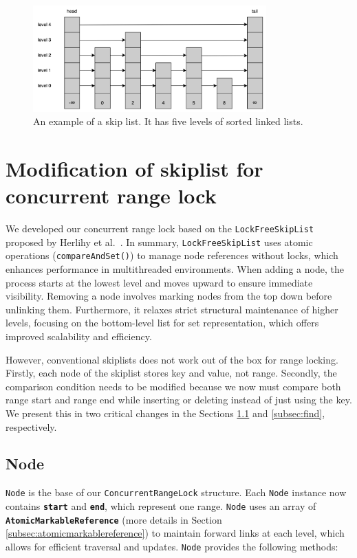 \begin{figure}[h!]
    \centering
    \includegraphics[width=0.8\textwidth]{./figures/skiplist.png}
    \caption{An example of a skip list. It has five levels of sorted linked lists.}
    \label{fig:skiplist}
\end{figure}

\section{Modification of skiplist for concurrent range lock}

We developed our concurrent range lock based on the \texttt{LockFreeSkipList} proposed by Herlihy et al.~\parencite{herlihy2020art}.
In summary, \texttt{LockFreeSkipList} uses atomic operations (\texttt{compareAndSet()}) to manage node references without locks, which enhances performance in multithreaded environments.
When adding a node, the process starts at the lowest level and moves upward to ensure immediate visibility.
Removing a node involves marking nodes from the top down before unlinking them.
Furthermore, it relaxes strict structural maintenance of higher levels, focusing on the bottom-level list for set representation, which offers improved scalability and efficiency.

However, conventional skiplists does not work out of the box for range locking. Firstly, each node of the skiplist stores key and value, not range. Secondly, the comparison condition needs to be modified because we now must compare both range start and range end while inserting or deleting instead of just using the key. We present this in two critical changes in the Sections \ref{subsec:node} and \ref{subsec:find}, respectively.

\subsection{Node}\label{subsec:node}

\texttt{Node} is the base of our \texttt{ConcurrentRangeLock} structure.
Each \texttt{Node} instance now contains \textbf{\texttt{start}} and \textbf{\texttt{end}}, which represent one range.
\texttt{Node} uses an array of \textbf{\texttt{AtomicMarkableReference}} (more details in Section \ref{subsec:atomicmarkablereference}) to maintain forward links at each level, which allows for efficient traversal and updates. 
\texttt{Node} provides the following methods:

